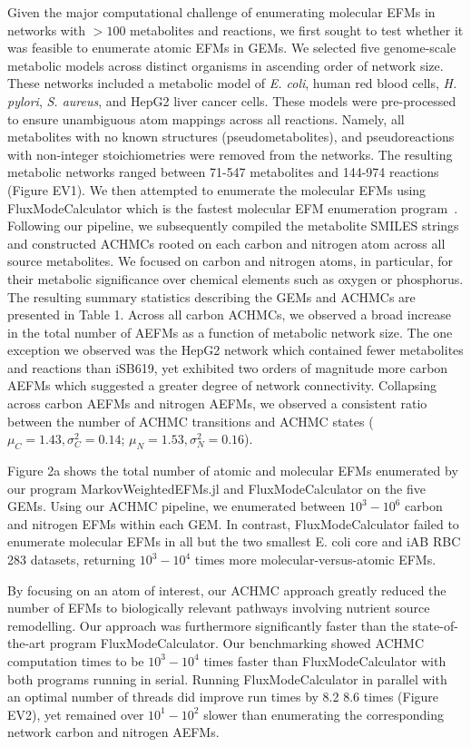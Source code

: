 \documentclass[12pt]{article}
\begin{document}
Given the major computational challenge of enumerating molecular EFMs in
networks with $>100$ metabolites and reactions, we first sought to test
whether it was feasible to enumerate atomic EFMs in GEMs. We selected five
genome-scale metabolic models across distinct organisms in ascending order
of network size. These networks included a metabolic model of \textit{E.
coli}, human red blood cells, \textit{H. pylori}, \textit{S. aureus}, and
HepG2 liver cancer cells. These models were pre-processed to ensure
unambiguous atom mappings across all reactions. Namely, all metabolites
with no known structures (pseudometabolites), and pseudoreactions with
non-integer stoichiometries were removed from the networks. The resulting
metabolic networks ranged between 71-547 metabolites and 144-974 reactions
(Figure EV1). We then attempted to enumerate the molecular EFMs using
FluxModeCalculator which is the fastest molecular EFM enumeration
program~\citep{vanKlinkenJanBert2016Faet}. Following our pipeline, we
subsequently compiled the metabolite SMILES strings and constructed ACHMCs
rooted on each carbon and nitrogen atom across all source metabolites. We
focused on carbon and nitrogen atoms, in particular, for their metabolic
significance over chemical elements such as oxygen or phosphorus. The
resulting summary statistics describing the GEMs and ACHMCs are presented
in Table 1. Across all carbon ACHMCs, we observed a broad increase in the
total number of AEFMs as a function of metabolic network size. The one
exception we observed was the HepG2 network which contained fewer
metabolites and reactions than iSB619, yet exhibited two orders of
magnitude more carbon AEFMs which suggested a greater degree of network
connectivity. Collapsing across carbon AEFMs and nitrogen AEFMs, we
observed a consistent ratio between the number of ACHMC transitions and
ACHMC states ($\mu_C = 1.43, \sigma^2_C = 0.14$; $\mu_N = 1.53, \sigma^2_N
= 0.16$).

Figure 2a shows the total number of atomic and molecular EFMs enumerated
by our program MarkovWeightedEFMs.jl and FluxModeCalculator on the five
GEMs. Using our ACHMC pipeline, we enumerated between $10^3 - 10^6$ carbon
and nitrogen EFMs within each GEM. In contrast, FluxModeCalculator failed
to enumerate molecular EFMs in all but the two smallest E. coli core and
iAB RBC 283 datasets, returning $10^3 - 10^4$ times more
molecular-versus-atomic EFMs.

By focusing on an atom of interest, our ACHMC approach greatly reduced the
number of EFMs to biologically relevant pathways involving nutrient source
remodelling. Our approach was furthermore significantly faster than the
state-of-the-art program FluxModeCalculator. Our benchmarking showed ACHMC
computation times to be $10^3-10^4$ times faster than FluxModeCalculator
with both programs running in serial. Running FluxModeCalculator in
parallel with an optimal number of threads did improve run times by 8.2
8.6 times (Figure EV2), yet remained over $10^1-10^2$ slower than
  enumerating the corresponding network carbon and nitrogen AEFMs.
\end{document}

